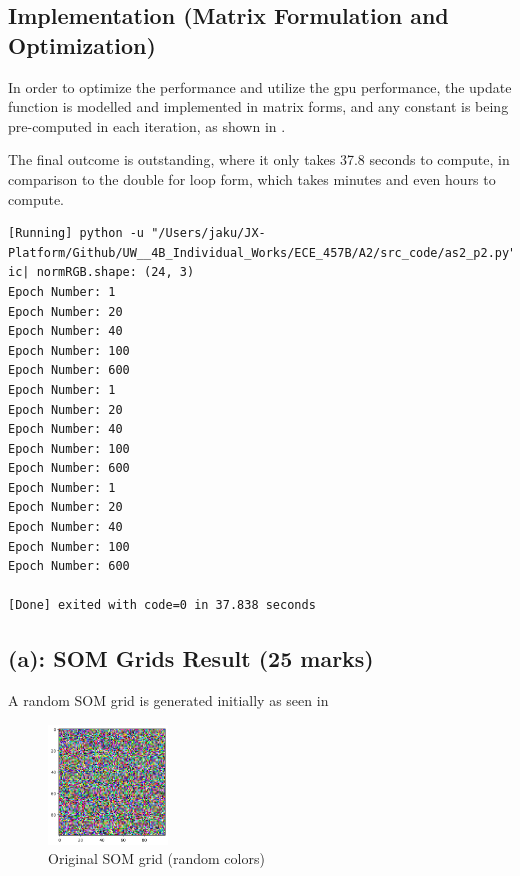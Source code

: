 \documentclass{tron}
\begin{document}
\subsection{Implementation (Matrix Formulation and Optimization)}
In order to optimize the performance and utilize the gpu performance, the update function is modelled and implemented in matrix forms, and any constant is being pre-computed in each iteration, as shown in . 


The final outcome is outstanding, where it only takes 37.8 seconds to compute, in comparison to the double for loop form, which takes minutes and even hours to compute.
\begin{lstlisting}[style=mystyle:output]
[Running] python -u "/Users/jaku/JX-Platform/Github/UW__4B_Individual_Works/ECE_457B/A2/src_code/as2_p2.py"
ic| normRGB.shape: (24, 3)
Epoch Number: 1
Epoch Number: 20
Epoch Number: 40
Epoch Number: 100
Epoch Number: 600
Epoch Number: 1
Epoch Number: 20
Epoch Number: 40
Epoch Number: 100
Epoch Number: 600
Epoch Number: 1
Epoch Number: 20
Epoch Number: 40
Epoch Number: 100
Epoch Number: 600

[Done] exited with code=0 in 37.838 seconds
\end{lstlisting}

\subsection{(a): SOM Grids Result (25 marks)}
A random SOM grid is generated initially as seen in 
\begin{figure}[H]
	\center
	\includegraphics[height=120px]{../src_code/output/p2/w_0}
	\caption{Original SOM grid (random colors)}
	\label{fig:p2:orig}
\end{figure}
\end{document}
